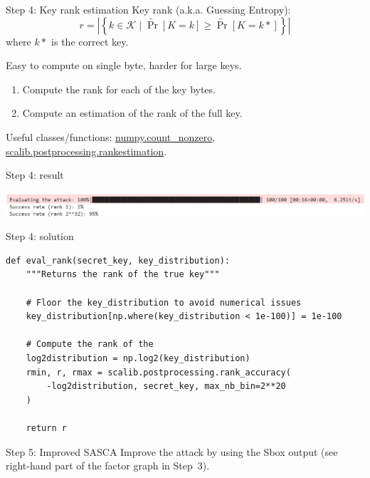 \documentclass[aspectratio=169]{beamer}
\begin{document}
\begin{frame}{Step 4: Key rank estimation}
    Key rank (a.k.a. Guessing Entropy):
    \[
        r = \left\vert\left\{
            k \in \mathcal{K} \;|\; \tilde{\Pr}[K=k] \ge \tilde{\Pr}[K=k*]
            \right\}\right\vert
    \]
    where $k*$ is the correct key.

    Easy to compute on single byte, harder for large keys.

    \begin{enumerate}
        \item Compute the rank for each of the key bytes.
        \item Compute an estimation of the rank of the full key.
    \end{enumerate}

    Useful classes/functions:
    \href{https://numpy.org/doc/stable/reference/generated/numpy.count_nonzero.html}{numpy.count\_nonzero},
    \href{https://scalib.readthedocs.io/en/stable/source/api/scalib.postprocessing.rankestimation.html}{scalib.postprocessing.rankestimation}.
\end{frame}
\begin{frame}{Step 4: result}
    \begin{center}
        \includegraphics[width=\textwidth]{figures/res_step4.png}
    \end{center}
\end{frame}

\begin{frame}[containsverbatim]{Step 4: solution}
\begin{verbatim}
def eval_rank(secret_key, key_distribution):
    """Returns the rank of the true key"""

    # Floor the key_distribution to avoid numerical issues
    key_distribution[np.where(key_distribution < 1e-100)] = 1e-100

    # Compute the rank of the
    log2distribution = np.log2(key_distribution)
    rmin, r, rmax = scalib.postprocessing.rank_accuracy(
        -log2distribution, secret_key, max_nb_bin=2**20
    )

    return r

\end{verbatim}
\end{frame}

\begin{frame}{Step 5: Improved SASCA}
    Improve the attack by using the Sbox output (see right-hand part of the
    factor graph in Step~3).
\end{frame}
\end{document}
